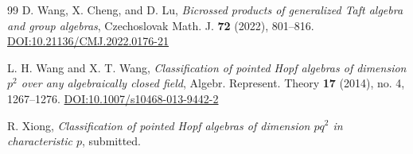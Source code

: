 \documentclass[twoside,11pt]{amsart}
\begin{document}
\begin{thebibliography}{99}
		D. Wang, X. Cheng, and D. Lu,
		\emph{Bicrossed products of generalized Taft algebra and group algebras},
		Czechoslovak Math. J. \textbf{72} (2022), 801--816.
		\href{https://doi.org/10.21136/CMJ.2022.0176-21}{DOI:10.21136/CMJ.2022.0176-21}
		
		L. H. Wang and X. T. Wang,
		\emph{Classification of pointed Hopf algebras of dimension $p^2$ over any
			algebraically closed field},
		Algebr. Represent. Theory \textbf{17} (2014), no. 4, 1267--1276.
		\href{https://doi.org/10.1007/s10468-013-9442-2}{DOI:10.1007/s10468-013-9442-2}
		
		R. Xiong,
		\emph{Classification of pointed Hopf algebras of dimension $pq^2$ in
			characteristic $p$},
		submitted.
		
	\end{thebibliography}
	
\end{document}
